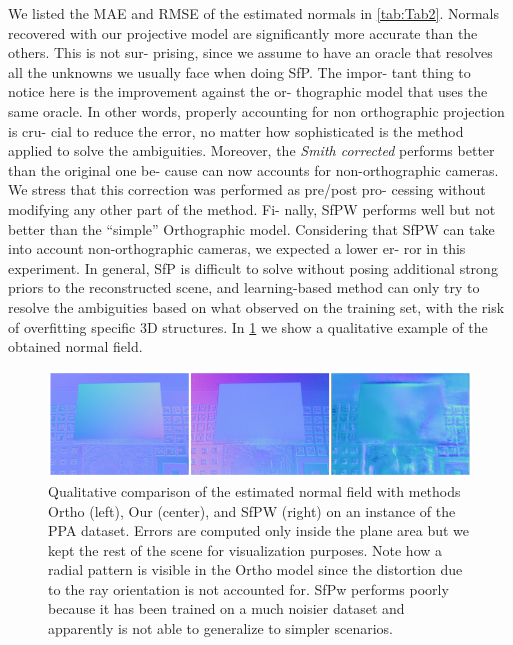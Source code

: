 \documentclass[letterpaper, 6 pt, journal, twoside]{IEEEtran}
\begin{document}
    We listed the MAE and RMSE of the estimated normals
in \cref{tab:Tab2}. Normals recovered with our projective model are
significantly more accurate than the others. This is not sur-
prising, since we assume to have an oracle that resolves all
the unknowns we usually face when doing SfP. The impor-
tant thing to notice here is the improvement against the or-
thographic model that uses the same oracle. In other words,
properly accounting for non orthographic projection is cru-
cial to reduce the error, no matter how sophisticated is the
method applied to solve the ambiguities. Moreover, the
\textit{Smith corrected} performs better than the original one be-
cause can now accounts for non-orthographic cameras. We
stress that this correction was performed as pre/post pro-
cessing without modifying any other part of the method. Fi-
nally, SfPW performs well but not better than the “simple”
Orthographic model. Considering that SfPW can take into
account non-orthographic cameras, we expected a lower er-
ror in this experiment. In general, SfP is difficult to solve
without posing additional strong priors to the reconstructed
scene, and learning-based method can only try to resolve
the ambiguities based on what observed on the training set,
with the risk of overfitting specific 3D structures. In \cref{fig:Fig4}
we show a qualitative example of the obtained normal field.

\begin{figure}
    \centering
    \includegraphics[width=18cm]{images/Figure_4.png} 
    \caption{Qualitative comparison of the estimated normal field with methods Ortho (left), Our (center), and SfPW (right) on an instance of the PPA dataset. Errors are computed only inside the plane area but we kept the rest of the scene for visualization purposes. Note how a radial pattern is visible in the Ortho model since the distortion due to the ray orientation is not accounted for. SfPw performs poorly because it has been trained on a much noisier dataset and apparently is not able to generalize to simpler scenarios.}
    \label{fig:Fig4}
\end{figure}

{\small


}
\end{document}
